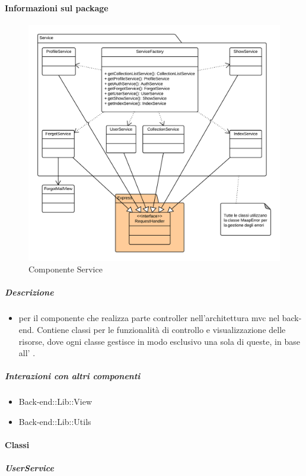 	\paragraph{Informazioni sul package} 
		\begin{figure}[H] 
			\begin{center} 
				\includegraphics[width=\textwidth]{uml/package/Back-end::Lib::Controller::Service.png}  
				\caption{Componente Service}
			\end{center}  
		\end{figure} 
	\subparagraph{Descrizione} 
		\begin{itemize}
		\item[]  per il componente che realizza parte controller nell’architettura mvc nel back-
end. Contiene classi per le funzionalità di controllo e visualizzazione delle risorse, dove ogni
classe gestisce in modo esclusivo una sola di queste, in base all’  .

		\end{itemize} 
	\subparagraph{Interazioni con altri componenti} 
		\begin{itemize} 
				\item Back-end::Lib::View
				\item Back-end::Lib::Utils  
		\end{itemize} 
		\paragraph{Classi}
			\subparagraph{UserService}
				
